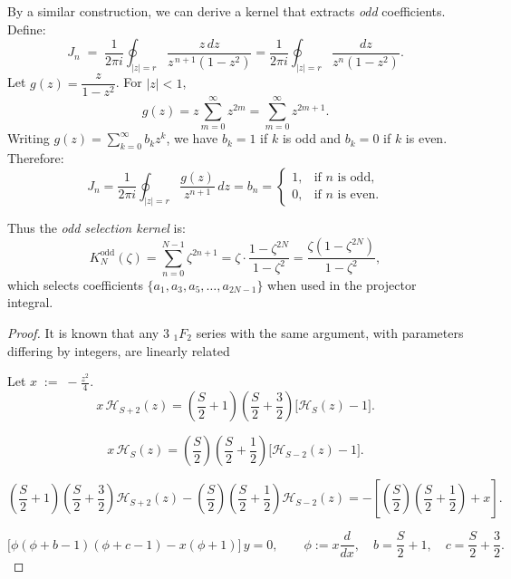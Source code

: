 \begin{lemma}\label{rem:odd-selector}
By a similar construction, we can derive a kernel that extracts \emph{odd} coefficients. Define:
\[
J_n \;=\; \frac{1}{2\pi i}\oint_{|z|=r}\frac{z\,dz}{z^{\,n+1}(1-z^2)} = \frac{1}{2\pi i}\oint_{|z|=r}\frac{dz}{z^{n}(1-z^2)}.
\]
Let $g(z) = \dfrac{z}{1-z^2}$. For $|z|<1$,
\[
g(z) = z \sum_{m=0}^{\infty} z^{2m} = \sum_{m=0}^{\infty} z^{2m+1}.
\]
Writing $g(z)=\sum_{k=0}^{\infty} b_k z^k$, we have $b_k=1$ if $k$ is odd and $b_k=0$ if $k$ is even. Therefore:
\[
J_n = \frac{1}{2\pi i}\oint_{|z|=r}\frac{g(z)}{z^{n+1}}\,dz = b_n = \begin{cases}
1,& \text{if $n$ is odd},\\[4pt]
0,& \text{if $n$ is even}.
\end{cases}
\]

Thus the \emph{odd selection kernel} is:
\[
K_N^{\text{odd}}(\zeta) = \sum_{n=0}^{N-1} \zeta^{2n+1} = \zeta \cdot \frac{1 - \zeta^{2N}}{1 - \zeta^2} = \frac{\zeta(1-\zeta^{2N})}{1-\zeta^2},
\]
which selects coefficients $\{a_1, a_3, a_5, \ldots, a_{2N-1}\}$ when used in the projector integral.
\end{lemma}

\begin{lemma}

\begin{proof}
It is known that any 3 ${}_1F_2$ series with the same argument, with parameters differing by integers, are linearly related\cite{}

Let $x \;:=\; -\frac{z^2}{4}.$
\begin{equation}\label{eq:H_raise}
x\,\mathcal{H}_{S+2}(z)
=\left(\frac{S}{2}+1\right)\left(\frac{S}{2}+\frac{3}{2}\right)\big[\mathcal{H}_S(z)-1\big].
\tag{R+}
\end{equation}

\begin{equation}\label{eq:H_lower}
x\,\mathcal{H}_S(z)
=\left(\frac{S}{2}\right)\left(\frac{S}{2}+\frac{1}{2}\right)\big[\mathcal{H}_{S-2}(z)-1\big].
\tag{R-}
\end{equation}

\begin{equation}\label{eq:H_contiguous}
\left(\frac{S}{2}+1\right)\left(\frac{S}{2}+\frac{3}{2}\right)\mathcal{H}_{S+2}(z)
-\left(\frac{S}{2}\right)\left(\frac{S}{2}+\frac{1}{2}\right)\mathcal{H}_{S-2}(z)
= -\left[\left(\frac{S}{2}\right)\left(\frac{S}{2}+\frac{1}{2}\right)+x\right].
\tag{C}
\end{equation}

\[
\Big[\phi(\phi+b-1)(\phi+c-1)-x(\phi+1)\Big]\,y=0,
\qquad
\phi:=x\frac{d}{dx},\quad b=\frac{S}{2}+1,\quad c=\frac{S}{2}+\frac{3}{2}.
\]
\end{proof}
\end{lemma}

